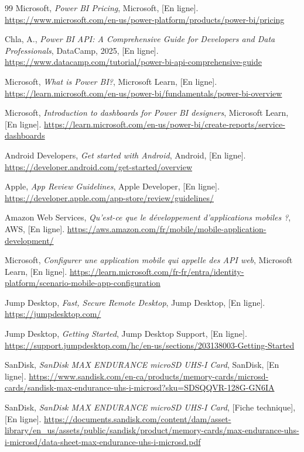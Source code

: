 \begin{thebibliographyUL}{99}
   Microsoft, \emph{Power BI Pricing}, Microsoft, [En ligne]. \url{https://www.microsoft.com/en-us/power-platform/products/power-bi/pricing}

   Chla, A., \emph{Power BI API: A Comprehensive Guide for Developers and Data Professionals}, DataCamp, 2025, [En ligne]. \url{https://www.datacamp.com/tutorial/power-bi-api-comprehensive-guide}

   Microsoft, \emph{What is Power BI?}, Microsoft Learn, [En ligne]. \url{https://learn.microsoft.com/en-us/power-bi/fundamentals/power-bi-overview}

   Microsoft, \emph{Introduction to dashboards for Power BI designers}, Microsoft Learn, [En ligne]. \url{https://learn.microsoft.com/en-us/power-bi/create-reports/service-dashboards}

   Android Developers, \emph{Get started with Android}, Android, [En ligne]. \url{https://developer.android.com/get-started/overview}

   Apple, \emph{App Review Guidelines}, Apple Developer, [En ligne]. \url{https://developer.apple.com/app-store/review/guidelines/}

   Amazon Web Services, \emph{Qu'est-ce que le développement d'applications mobiles ?}, AWS, [En ligne]. \url{https://aws.amazon.com/fr/mobile/mobile-application-development/}

   Microsoft, \emph{Configurer une application mobile qui appelle des API web}, Microsoft Learn, [En ligne]. \url{https://learn.microsoft.com/fr-fr/entra/identity-platform/scenario-mobile-app-configuration}

   Jump Desktop, \emph{Fast, Secure Remote Desktop}, Jump Desktop, [En ligne]. \url{https://jumpdesktop.com/}

   Jump Desktop, \emph{Getting Started}, Jump Desktop Support, [En ligne]. \url{https://support.jumpdesktop.com/hc/en-us/sections/203138003-Getting-Started}

   SanDisk, \emph{SanDisk MAX ENDURANCE microSD UHS-I Card}, SanDisk, [En ligne]. \url{https://www.sandisk.com/en-ca/products/memory-cards/microsd-cards/sandisk-max-endurance-uhs-i-microsd?sku=SDSQQVR-128G-GN6IA}

   SanDisk, \emph{SanDisk MAX ENDURANCE microSD UHS-I Card}, [Fiche technique], [En ligne]. \url{https://documents.sandisk.com/content/dam/asset-library/en_us/assets/public/sandisk/product/memory-cards/max-endurance-uhs-i-microsd/data-sheet-max-endurance-uhs-i-microsd.pdf}


\end{thebibliographyUL}
